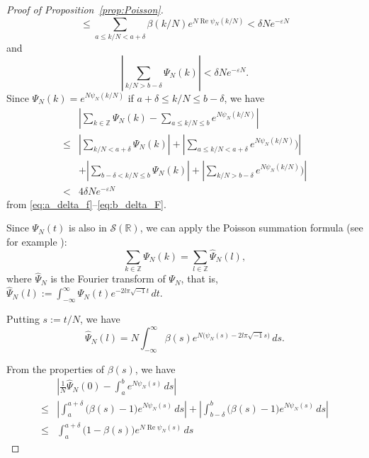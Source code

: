 \documentclass[a4paper,dvipdfmx]{amsart}
\theoremstyle{plain}
\theoremstyle{definition}
\theoremstyle{remark}
\newcommand{\Z}{\mathbb{Z}}
\newcommand{\R}{\mathbb{R}}
\renewcommand{\Re}{\operatorname{Re}}
\renewcommand{\i}{\sqrt{-1}}
\numberwithin{equation}{section}
\begin{document}
\begin{proof}[Proof of Proposition~\ref{prop:Poisson}]
\begin{equation}
  \le
  \sum_{a\le k/N<a+\delta}\beta(k/N)e^{N\Re{\psi_N(k/N)}}
  <
  \delta Ne^{-\varepsilon N}
\end{equation}
and
\begin{equation}\label{eq:b_delta_F}
  \left|\sum_{k/N>b-\delta}\Psi_N(k)\right|
  <
  \delta Ne^{-\varepsilon N}.
\end{equation}
Since $\Psi_N(k)=e^{N\psi_N(k/N)}$ if $a+\delta\le k/N\le b-\delta$, we have
\begin{equation}\label{eq:F_f}
\begin{split}
  &
  \left|\sum_{k\in\Z}\Psi_N(k)-\sum_{a\le k/N\le b}e^{N\psi_N(k/N)}\right|
  \\
  \le&
  \left|\sum_{k/N<a+\delta}\Psi_N(k)\right|
  +
  \left|\sum_{a\le k/N<a+\delta}e^{N\psi_N(k/N)})\right|
  \\
  &+
  \left|\sum_{b-\delta<k/N\le b}\Psi_N(k)\right|
  +
  \left|\sum_{k/N>b-\delta}e^{N\psi_N(k/N)})\right|
  \\
  <&
  4\delta Ne^{-\varepsilon N}
\end{split}
\end{equation}
from \eqref{eq:a_delta_f}--\eqref{eq:b_delta_F}.
\par
Since $\Psi_N(t)$ is also in $\mathcal{S}(\R)$, we can apply the Poisson summation formula (see for example \cite[Theorem~3.1]{Stein/Shakarchi2003}):
\begin{equation}\label{eq:F_Fhat}
  \sum_{k\in\Z}\Psi_N(k)
  =
  \sum_{l\in\Z}\hat\Psi_N(l),
\end{equation}
where $\hat\Psi_N$ is the Fourier transform of $\Psi_N$, that is, $\hat\Psi_N(l):=\int_{-\infty}^{\infty}\Psi_N(t)e^{-2l\pi\i t}\,dt$.
\par
Putting $s:=t/N$, we have
\begin{equation}\label{eq:Fhat}
  \hat\Psi_N(l)
  =
  N
  \int_{-\infty}^{\infty}
  \beta(s)e^{N\bigl(\psi_N(s)-2l\pi\i s\bigr)}\,ds.
\end{equation}
\par
From the properties of $\beta(s)$, we have
\begin{equation}\label{eq:Fhat_0}
\begin{split}
  &\left|
    \frac{1}{N}\hat\Psi_N(0)-\int_{a}^{b}e^{N\psi_N(s)}\,ds
  \right|
  \\
  \le&
  \left|\int_{a}^{a+\delta}\bigl(\beta(s)-1\bigr)e^{N\psi_N(s)}\,ds\right|
  +
  \left|\int_{b-\delta}^{b}\bigl(\beta(s)-1\bigr)e^{N\psi_N(s)}\,ds\right|
  \\
  \le&
  \int_{a}^{a+\delta}\bigl(1-\beta(s)\bigr)e^{N\Re{\psi_N(s)}}\,ds

\end{split}
\end{equation}
\end{proof}
\end{document}
